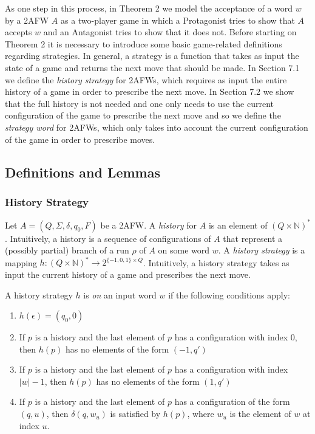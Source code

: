\documentclass[10pt,a4paper]{amsart}
\theoremstyle{plain}
\theoremstyle{definition}
\theoremstyle{definition}
\DeclareMathOperator{\?}{?}
\begin{document}
As one step in this process, in Theorem 2 we model the acceptance of a word $w$ by a 2AFW $A$ as a two-player game in which a Protagonist tries to show that $A$ accepts $w$ and an Antagonist tries to show that it does not. Before starting on Theorem 2 it is necessary to introduce some basic game-related definitions regarding strategies. In general, a strategy is a function that takes as input the state of a game and returns the next move that should be made. In Section 7.1 we define the \textit{history strategy} for 2AFWs, which requires as input the entire history of a game in order to prescribe the next move. In Section 7.2 we show that the full history is not needed and one only needs to use the current configuration of the game to prescribe the next move and so we define the \textit{strategy word} for 2AFWs, which only takes into account the current configuration of the game in order to prescribe moves.


\subsection{Definitions and Lemmas}

\subsubsection{History Strategy}
Let $A = (Q,\Sigma,\delta,q_0,F)$ be a 2AFW. A \textit{history} for $A$ is an element of
$(Q \times \mathbb{N})^*$. Intuitively, a history is a sequence of configurations of $A$ that
represent a (possibly partial) branch of a run $\rho$ of $A$ on some word $w$.
A \textit{history strategy} is a mapping
$h : (Q \times \mathbb{N})^* \rightarrow 2^{\{-1,0,1 \} \times Q  }$.
Intuitively, a history strategy takes as input the current history of a game and prescribes the next move.

A history strategy $h$ is \textit{on} an input word $w$ if the following conditions apply:

\begin{enumerate}
    \item $h(\epsilon) = (q_0,0)$
    \item If $p$ is a history and the last element of $p$ has a configuration with index 0, then $h(p)$ has no elements of the form $(-1,q')$
    \item If $p$ is a history and the last element of $p$ has a configuration with index $|w| - 1$, then $h(p)$ has no elements of the form $(1,q')$
    \item If $p$ is a history and the last element of $p$ has a configuration of the form $(q,u)$, then $\delta(q,w_u)$ is satisfied by $h(p)$, where $w_u$ is the element of $w$ at index $u$.
\end{enumerate}
\end{document}
